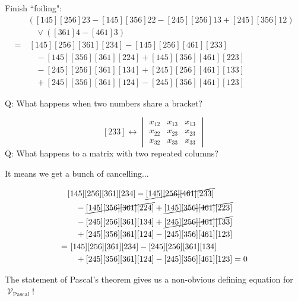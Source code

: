 \documentclass[%
	12pt]{beamer}
\theoremstyle{plain}
\theoremstyle{definition}
\DeclareMathOperator{\Var}{\mathcal V}
\begin{document}
\begin{frame}
Finish ``foiling": 
\begin{align*}
 & \left([145][256]23-[145][356]22-[245][256]13+[245][356]12\right) \\
 & \quad \vee([361]4-[461]3) \\
 =&\ [145][256][361][234]-[145][256][461][233] \\
 & \quad -[145][356][361][224]+[145][356][461][223] \\
 & \quad -[245][256][361][134]+[245][256][461][133] \\
 & \quad +[245][356][361][124]-[245][356][461][123] 
\end{align*}

\pause
{\color{powCol}Q:} What happens when two numbers share a bracket?
\end{frame}

\begin{frame}
\[
[233]\leftrightarrow
\begin{vmatrix}
x_{12} & x_{13} & x_{13} \\
x_{22} & x_{23} & x_{23} \\
x_{32} & x_{33} & x_{33}
\end{vmatrix}
\]
{\color{powCol}Q:} What happens to a matrix with two repeated columns?

\pause
\vspace{1pc}
It means we get a bunch of cancelling...
\end{frame}

\begin{frame} 
\begin{align*}
 & [145][256][361][234]-\cancel{[145][256][461][233]} \\
 & \quad -\cancel{[145][356][361][224]}+\cancel{[145][356][461][223]} \\
 & \quad -[245][256][361][134]+\cancel{[245][256][461][133]} \\
 & \quad +[245][356][361][124]-[245][356][461][123] \\
 =&\ [145][256][361][234]-[245][256][361][134] \\
 & \quad +[245][356][361][124]-[245][356][461][123]=0
\end{align*}

\pause
The statement of Pascal's theorem gives us a non-obvious defining equation for $\Var_{\text{Pascal}}$!
\end{frame}
\end{document}
